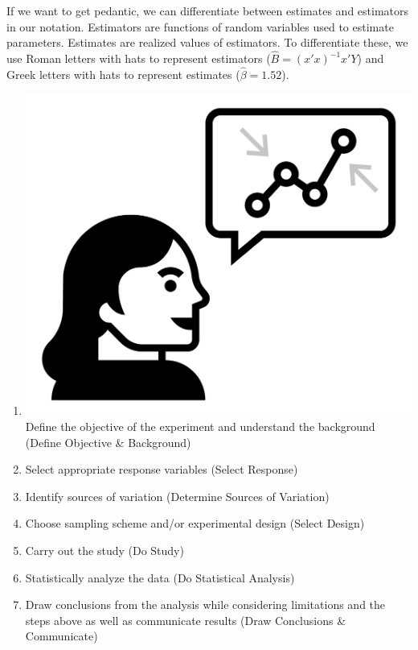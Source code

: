 \documentclass[
]{book}
\providecommand{\tightlist}{%
  \setlength{\itemsep}{0pt}\setlength{\parskip}{0pt}}
\theoremstyle{definition}
\theoremstyle{definition}
\theoremstyle{definition}
\theoremstyle{remark}
\begin{document}
If we want to get pedantic, we can differentiate between estimates and estimators in our notation. Estimators are functions of random variables used to estimate parameters. Estimates are realized values of estimators. To differentiate these, we use Roman letters with hats to represent estimators (\(\hat B = (x'x )^{-1}x'Y\)) and Greek letters with hats to represent estimates (\(\hat \beta = 1.52\)).

\begin{enumerate}
\def\labelenumi{\arabic{enumi}.}
\tightlist
\item
  \includegraphics{img/conclude-communicate.png} Define the objective of the experiment and understand the background (Define Objective \& Background)\\
\item
  Select appropriate response variables (Select Response)\\
\item
  Identify sources of variation (Determine Sources of Variation)\\
\item
  Choose sampling scheme and/or experimental design (Select Design)\\
\item
  Carry out the study (Do Study)
\item
  Statistically analyze the data (Do Statistical Analysis)\\
\item
  Draw conclusions from the analysis while considering limitations and the steps above as well as communicate results (Draw Conclusions \& Communicate)
\end{enumerate}

  
\end{document}
